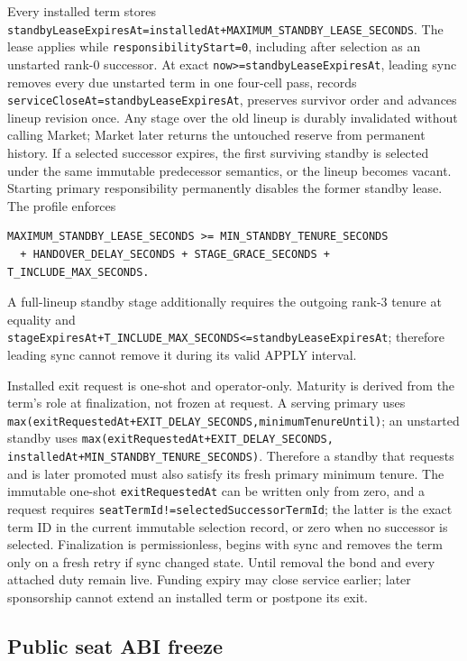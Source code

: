 \documentclass[a4paper,11pt]{article}
\newcommand{\code}[1]{\nolinkurl{#1}}
\begin{document}
Every installed term stores
\code{standbyLeaseExpiresAt=installedAt+MAXIMUM_STANDBY_LEASE_SECONDS}.  The
lease applies while \code{responsibilityStart=0}, including after selection as
an unstarted rank-0 successor.  At exact
\code{now>=standbyLeaseExpiresAt}, leading sync removes every due unstarted term
in one four-cell pass, records \code{serviceCloseAt=standbyLeaseExpiresAt},
preserves survivor order and advances lineup revision once.  Any stage over the
old lineup is durably invalidated without calling Market; Market later returns
the untouched reserve from permanent history.  If a selected successor expires,
the first surviving standby is selected under the same immutable predecessor
semantics, or the lineup becomes vacant.  Starting primary responsibility
permanently disables the former standby lease.  The profile enforces
\begin{verbatim}
MAXIMUM_STANDBY_LEASE_SECONDS >= MIN_STANDBY_TENURE_SECONDS
  + HANDOVER_DELAY_SECONDS + STAGE_GRACE_SECONDS + T_INCLUDE_MAX_SECONDS.
\end{verbatim}
A full-lineup standby stage additionally requires the outgoing rank-3 tenure at
equality and
\code{stageExpiresAt+T_INCLUDE_MAX_SECONDS<=standbyLeaseExpiresAt}; therefore
leading sync cannot remove it during its valid APPLY interval.

Installed exit request is one-shot and operator-only.  Maturity is derived from
the term's role at finalization, not frozen at request.  A serving primary uses
\code{max(exitRequestedAt+EXIT_DELAY_SECONDS,minimumTenureUntil)}; an unstarted
standby uses \code{max(exitRequestedAt+EXIT_DELAY_SECONDS,
installedAt+MIN_STANDBY_TENURE_SECONDS)}.  Therefore a standby that requests and
is later promoted must also satisfy its fresh primary minimum tenure.  The immutable one-shot
\code{exitRequestedAt} can be written only from zero, and a request requires
\code{seatTermId!=selectedSuccessorTermId}; the latter is the exact term ID in
the current immutable selection record, or zero when no successor is selected.
Finalization is permissionless, begins with sync and removes the term only on a
fresh retry if sync changed state.  Until removal the bond and every attached
duty remain live.  Funding expiry may close service earlier; later sponsorship
cannot extend an installed term or postpone its exit.

\subsection{Public seat ABI freeze}\label{sec:seat-public-abi}
\end{document}
